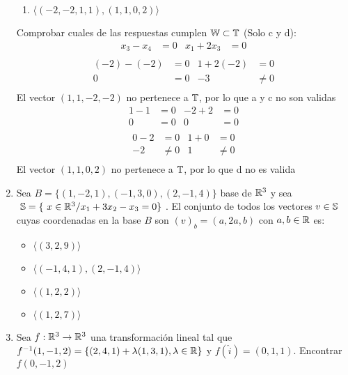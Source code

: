 \documentclass[../practica.root.tex]{subfiles}
\begin{document}
\begin{enumerate}
\begin{enumerate}
              \item \( \langle (−2,−2,1,1),(1,1,0,2) \rangle \) \xmark
          \end{enumerate}
          Comprobar cuales de las respuestas cumplen \( \W \subset \T \) (Solo c y d):
          \begin{align*}
              x_3 − x_4 & = 0 & x_1 + 2x_3 & = 0 \\
          \end{align*}
          \begin{align*}
              (-2) − (-2) & = 0 & 1 + 2(-2) & = 0    \\
              0           & = 0 & -3        & \neq 0 \\
          \end{align*}
          El vector \( (1,1,-2,-2) \) no pertenece a \( \T \), por lo que a y c no son validas
          \begin{align*}
              1 - 1 & = 0 & -2 + 2 & = 0 \\
              0     & = 0 & 0      & = 0 \\
          \end{align*}
          \begin{align*}
              0 - 2 & = 0    & 1 + 0 & = 0    \\
              -2    & \neq 0 & 1     & \neq 0 \\
          \end{align*}
          El vector \( (1,1,0,2) \) no pertenece a \( \T \), por lo que d no es valida
    \item Sea \( B = \{(1,-2,1),(-1,3,0),(2,-1,4) \}\) base de \( \R^3 \) y sea \( \S = \{ x \in \R^3 / x_1 + 3x_2 - x_3 = 0 \} \). El conjunto de todos los vectores \( v \in \S \) cuyas coordenadas en la base \(B\) son \( (v)_b = (a,2a,b) \) con \( a,b \in \R \) es:
          \begin{itemize}
              \item \(\langle (3,2,9) \rangle\)
              \item \(\langle (-1,4,1),(2,-1,4) \rangle\)
              \item \(\langle (1,2,2) \rangle\)
              \item \(\langle (1,2,7) \rangle\)
          \end{itemize}
    \item Sea \( f : \R^3 \to \R^3 \) una transformación lineal tal que \( f^{-1}(1,-1,2) = \{ (2,4,1) + \lambda(1,3,1),\lambda \in \R \} \) y \( f(\hat{i}) = (0,1,1) \). Encontrar \( f(0,-1,2) \) \\ \\

\end{enumerate}
\end{document}
